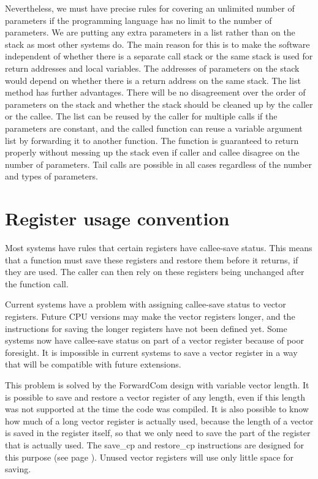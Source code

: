 \documentclass[forwardcom.tex]{subfiles}
\begin{document}
Nevertheless, we must have precise rules for covering an unlimited number of parameters if the programming language has no limit to the number of parameters. We are putting any extra parameters in a list rather than on the stack as most other systems do. The main reason for this is to make the software independent of whether there is a separate call stack or the same stack is used for return addresses and local variables. The addresses of parameters on the stack would depend on whether there is a return address on the same stack. The list method has further advantages. There will be no disagreement over the order of parameters on the stack and whether the stack should be cleaned up by the caller or the callee. The list can be reused by the caller for multiple calls if the parameters are constant, and the called function can reuse a variable argument list by forwarding it to another function. The function is guaranteed to return properly without messing up the stack even if caller and callee disagree on the number of parameters. Tail calls are possible in all cases regardless of the number and types of parameters. 
\vspace{2mm}

\section{Register usage convention} \label{registerUsageConvention}
Most systems have rules that certain registers have callee-save status. This means that a function must save these registers and restore them before it returns, if they are used. The caller can then rely on these registers being unchanged after the function call.
\vspace{2mm}

Current systems have a problem with assigning callee-save status to vector registers. Future CPU versions may make the vector registers longer, and the instructions for saving the longer registers have not been defined yet. Some systems now have callee-save status on part of a vector register because of poor foresight. It is impossible in current systems to save a vector register in a way that will be compatible with future extensions. 
\vspace{2mm}

This problem is solved by the ForwardCom design with variable vector length. It is possible to save and restore a vector register of any length, even if this length was not supported at the time the code was compiled. It is also possible to know how much of a long vector register is actually used, because the length of a vector is saved in the register itself, so that we only need to save the part of the register that is actually used. The save\_cp and restore\_cp instructions are designed for this purpose (see page \pageref{saveRestoreVectorRegisters}). Unused vector registers will use only little space for saving. 
\vspace{2mm}
\end{document}
